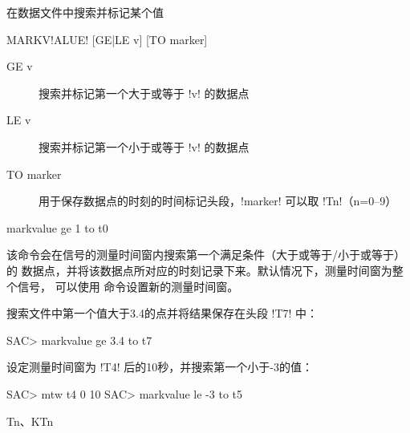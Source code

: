 \label{cmd:markvalue}

在数据文件中搜索并标记某个值

\begin{SACSTX}
MARKV!ALUE! [GE|LE v] [TO marker]
\end{SACSTX}

\begin{description}
\item [GE v] 搜索并标记第一个大于或等于 !v! 的数据点
\item [LE v] 搜索并标记第一个小于或等于 !v! 的数据点
\item [TO marker] 用于保存数据点的时刻的时间标记头段，!marker!
    可以取 !Tn!（n=0--9）
\end{description}

\begin{SACDFT}
markvalue ge 1 to t0
\end{SACDFT}

该命令会在信号的测量时间窗内搜索第一个满足条件（大于或等于/小于或等于）的
数据点，并将该数据点所对应的时刻记录下来。默认情况下，测量时间窗为整个信号，
可以使用  命令设置新的测量时间窗。

搜索文件中第一个值大于3.4的点并将结果保存在头段 !T7! 中：
\begin{SACCode}
SAC> markvalue ge 3.4 to t7
\end{SACCode}

设定测量时间窗为 !T4! 后的10秒，并搜索第一个小于-3的值：
\begin{SACCode}
SAC> mtw t4 0 10
SAC> markvalue le -3 to t5
\end{SACCode}

Tn、KTn

